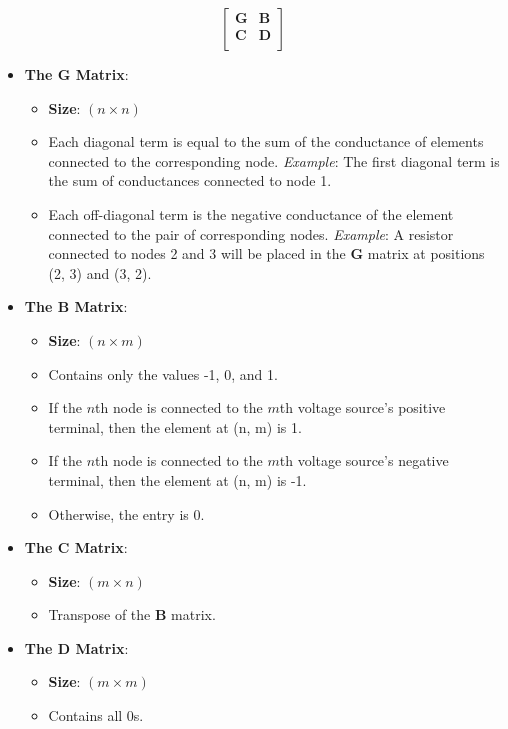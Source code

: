 \documentclass{article}
\begin{document}
\[
\begin{bmatrix}
\mathbf{G} &  \mathbf{B} \\
\mathbf{C} & \mathbf{D} \\
\end{bmatrix}
\]

\begin{itemize}
    \item \textbf{The $\mathbf{G}$ Matrix}:
    \begin{itemize}
        \item \textbf{Size}: \( (n \times n) \)
        \item Each diagonal term is equal to the sum of the conductance of elements connected to the corresponding node. \textit{Example}: The first diagonal term is the sum of conductances connected to node 1.
        \item Each off-diagonal term is the negative conductance of the element connected to the pair of corresponding nodes. \textit{Example}: A resistor connected to nodes 2 and 3 will be placed in the \(\mathbf{G}\) matrix at positions (2, 3) and (3, 2).
    \end{itemize}
    \item \textbf{The $\mathbf{B}$ Matrix}:
    \begin{itemize}
        \item \textbf{Size}: \( (n \times m) \)
        \item Contains only the values -1, 0, and 1.
        \item If the \(n\)th node is connected to the \(m\)th voltage source's positive terminal, then the element at (n, m) is 1.
        \item If the \(n\)th node is connected to the \(m\)th voltage source's negative terminal, then the element at (n, m) is -1.
        \item Otherwise, the entry is 0.
    \end{itemize}
    \item \textbf{The $\mathbf{C}$ Matrix}:
    \begin{itemize}
        \item \textbf{Size}: \( (m \times n) \)
        \item Transpose of the \(\mathbf{B}\) matrix.
    \end{itemize}
    \item \textbf{The $\mathbf{D}$ Matrix}:
    \begin{itemize}
        \item \textbf{Size}: \( (m \times m) \)
        \item Contains all 0s.
    \end{itemize}
\end{itemize}
\end{document}
